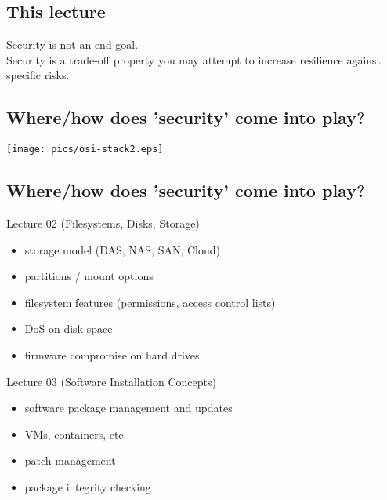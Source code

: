 \documentclass[xga]{xdvislides}
\begin{document}
\subsection{This lecture}
\vspace{.5in}
\Huge
\begin{center}
Security is not an end-goal. \\

\vspace{.5in}
Security is a trade-off property you may attempt to
increase resilience against specific risks.
\end{center}
\Normalsize


\subsection{Where/how does 'security' come into play?}
\vspace*{\fill}
\begin{center}
	\texttt{[image: pics/osi-stack2.eps]} \\
\end{center}
\vspace*{\fill}

\subsection{Where/how does 'security' come into play?}
Lecture 02 (Filesystems, Disks, Storage)
\begin{itemize}
	\item storage model (DAS, NAS, SAN, Cloud)
	\item partitions / mount options
	\item filesystem features (permissions, access control lists)
	\item DoS on disk space
	\item firmware compromise on hard drives
\end{itemize}
\vspace{.5in}
Lecture 03 (Software Installation Concepts)
\begin{itemize}
	\item software package management and updates
	\item VMs, containers, etc.
	\item patch management
	\item package integrity checking
\end{itemize}
\end{document}
